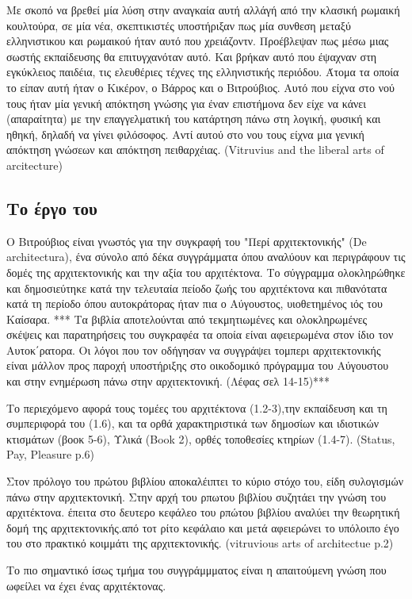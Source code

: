 Με σκοπό να βρεθεί μία λύση στην αναγκαία αυτή αλλάγή από την κλασική ρωμαική κουλτούρα, σε μία νέα, σκεπτικιστές υποστήριξαν πως μία συνθεση μεταξύ ελληνιστικου και ρωμαικού ήταν αυτό που χρειάζοντν. Προέβλεψαν πως μέσω μιας σωστής εκπαίδευσης θα επιτυγχανόταν αυτό. Και βρήκαν αυτό που έψαχναν στη εγκύκλειος παιδέια, τις ελευθέριες τέχνες της ελληνιστικής περιόδου. Άτομα τα οποία το είπαν αυτή ήταν ο Κικέρον, ο Βάρρος και ο Βιτρούβιος. Αυτό που είχνα στο νού τους ήταν μία γενική απόκτηση γνώσης για έναν επιστήμονα δεν είχε να κάνει (απαραίτητα) με την επαγγελματική του κατάρτηση πάνω στη λογική, φυσική και ηθηκή, δηλαδή να γίνει φιλόσοφος. Αντί αυτού στο νου τους είχνα μια γενική απόκτηση γνώσεων και απόκτηση πειθαρχέιας. (Vitruvius and the liberal arts of arcitecture)

\subsection{Το έργο του} 

Ο Βιτρούβιος είναι γνωστός για την συγκραφή του "Περί αρχιτεκτονικής" (De architectura), ένα σύνολο από δέκα συγγράμματα όπου αναλύουν και περιγράφουν τις δομές της αρχιτεκτονικής και την αξία του αρχιτέκτονα.
Το σύγγραμμα ολοκληρώθηκε και δημοσιεύτηκε κατά την τελευταία πείοδο ζωής του αρχιτέκτονα και πιθανότατα κατά τη περίοδο όπου αυτοκράτορας ήταν πια ο Αύγουστος, υιοθετημένος ιός του Καίσαρα. ***
Τα βιβλία αποτελούνται από τεκμητιωμένες και ολοκληρωμένες σκέψεις και παρατηρήσεις του συγκραφέα τα οποία είναι αφειερωμένα στον ίδιο τον Αυτοκ΄ρατορα. Οι λόγοι που τον οδήγησαν να συγγράψει τομπερι αρχιτεκτονικής είναι μάλλον προς παροχή υποστήριξης στο οικοδομικό πρόγραμμα του Αύγουστου και στην ενημέρωση πάνω στην αρχιτεκτονική. (Λέφας σελ 14-15)***

Το περιεχόμενο αφορά τους τομέες του αρχιτέκτονα (1.2-3),την εκπαίδευση και τη συμπεριφορά του (1.6), και τα ορθά χαρακτηριστικά των δημοσίων και ιδιοτικών κτισμάτων (βοοκ 5-6), Υλικά (Book 2), ορθές τοποθεσίες κτηρίων (1.4-7). (Status, Pay, Pleasure p.6)

Στον πρόλογο του πρώτου βιβλίου αποκαλέιπτει το κύριο στόχο του, είδη συλογισμών πάνω στην αρχιτεκτονική. Στην αρχή του ρπωτου βιβλίου συζητάει την γνώση του αρχιτέκτονα. έπειτα στο δευτερο κεφάλεο του ρπώτου βιβλίου αναλύει την θεωρητική δομή της αρχιτεκτονικής.από τοτ ρίτο κεφάλαιο και μετά αφειερώνει το υπόλοιπο έγο του στο πρακτικό κοιμμάτι της αρχιτεκτονικής. (vitruvious arts of architectue p.2)

Το πιο σημαντικό ίσως τμήμα του συγγράμμματος είναι η απαιτούμενη γνώση που ωφείλει να έχει ένας αρχιτέκτονας.


